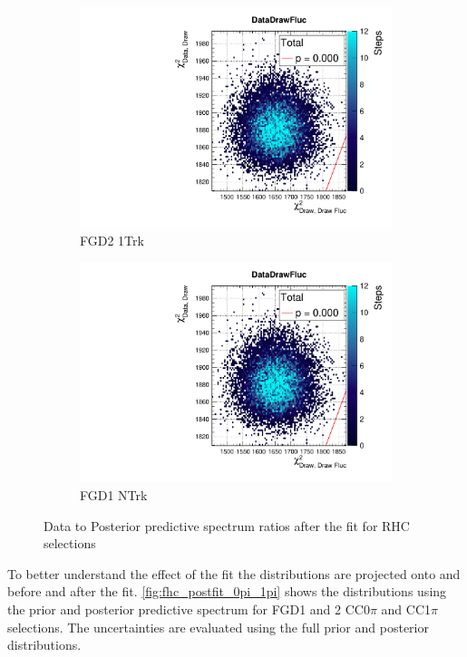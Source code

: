 \begin{figure}[h]
\begin{subfigure}[t]{0.24\textwidth}
	\includegraphics[width=\textwidth, trim={20mm 6mm 4mm 11mm}, clip,page=113]{figures/mach3/data/postpred/2017b_NewData_NewDet_UpdXsecStep_2Xsec_4Det_5Flux_0_PostPred_procs}
	\caption{FGD2 \numu 1Trk}
\end{subfigure}
\begin{subfigure}[t]{0.24\textwidth}
	\includegraphics[width=\textwidth, trim={20mm 6mm 4mm 11mm}, clip,page=122]{figures/mach3/data/postpred/2017b_NewData_NewDet_UpdXsecStep_2Xsec_4Det_5Flux_0_PostPred_procs}
	\caption{FGD1 \numu NTrk}
\end{subfigure}
\caption{Data to Posterior predictive \pmu \cosmu spectrum ratios after the fit for RHC selections}
\label{fig:posterior_pred_data_rhc}
\end{figure}

To better understand the effect of the fit the distributions are projected onto \pmu and \cosmu before and after the fit. \autoref{fig:fhc_postfit_0pi_1pi} shows the distributions using the prior and posterior predictive spectrum for FGD1 and 2 CC0$\pi$ and CC1$\pi$ selections. The uncertainties are evaluated using the full prior and posterior distributions.


